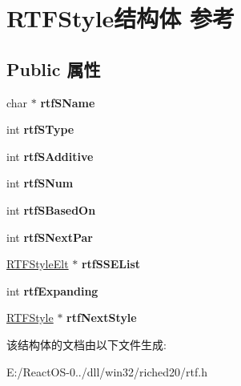 \hypertarget{struct_r_t_f_style}{}\section{R\+T\+F\+Style结构体 参考}
\label{struct_r_t_f_style}
\subsection*{Public 属性}
\begin{DoxyCompactItemize}
\item 
\mbox{\label{struct_r_t_f_style_a18d820f46359a58f2bc347e592e0f830}} 
char $\ast$ {\bfseries rtf\+S\+Name}
\item 
\mbox{\label{struct_r_t_f_style_a13913cc3b352a2ae769ef0d12f642e1f}} 
int {\bfseries rtf\+S\+Type}
\item 
\mbox{\label{struct_r_t_f_style_a5d5f2c5a2c6974daab4b74fefb64938c}} 
int {\bfseries rtf\+S\+Additive}
\item 
\mbox{\label{struct_r_t_f_style_ae7a98ed9fcf6f9dc2d4c200c13633fc4}} 
int {\bfseries rtf\+S\+Num}
\item 
\mbox{\label{struct_r_t_f_style_a6468dbed253efa7f92c0b2a45df9b9b5}} 
int {\bfseries rtf\+S\+Based\+On}
\item 
\mbox{\label{struct_r_t_f_style_a18343b673ff41b967e2a907976c91bd0}} 
int {\bfseries rtf\+S\+Next\+Par}
\item 
\mbox{\label{struct_r_t_f_style_a7a68d0613e1b1f12805bb92c8bda2763}} 
\hyperlink{struct_r_t_f_style_elt}{R\+T\+F\+Style\+Elt} $\ast$ {\bfseries rtf\+S\+S\+E\+List}
\item 
\mbox{\label{struct_r_t_f_style_aabe7edac6d29c1a55012cbb5fd4f35d8}} 
int {\bfseries rtf\+Expanding}
\item 
\mbox{\label{struct_r_t_f_style_ae7aa15ef9202841fd87ab38cbbc97918}} 
\hyperlink{struct_r_t_f_style}{R\+T\+F\+Style} $\ast$ {\bfseries rtf\+Next\+Style}
\end{DoxyCompactItemize}


该结构体的文档由以下文件生成\+:\begin{DoxyCompactItemize}
\item 
E\+:/\+React\+O\+S-\/0../dll/win32/riched20/rtf.\+h\end{DoxyCompactItemize}
